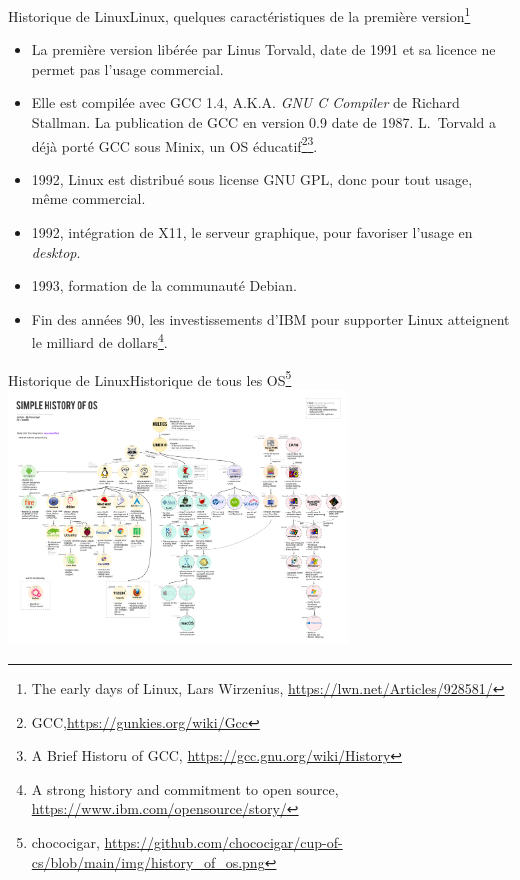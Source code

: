 \documentclass{beamer}
\begin{document}
    \begin{frame}{Historique de Linux}{Linux, quelques caractéristiques de la première version\footnote{The early days of Linux, Lars Wirzenius, \url{https://lwn.net/Articles/928581/}}}
        \begin{footnotesize}
            \begin{itemize}
                \item La première version libérée par Linus Torvald, date de 1991 et sa licence ne permet pas l'usage commercial.
                \item Elle est compilée avec GCC 1.4, A.K.A. \textit{GNU C Compiler} de Richard Stallman.
                La publication de GCC en version 0.9 date de 1987.
                L.~Torvald a déjà porté GCC sous Minix, un OS éducatif\footnote{GCC,\url{https://gunkies.org/wiki/Gcc}}\footnotestep\footnote{A Brief Historu of GCC, \url{https://gcc.gnu.org/wiki/History}}.
                \item 1992, Linux est distribué sous license GNU GPL, donc pour tout usage, même commercial.
                \item 1992, intégration de X11, le serveur graphique, pour favoriser l'usage en \textit{desktop}.
                \item 1993, formation de la communauté Debian.
                \item Fin des années 90, les investissements d'IBM pour supporter Linux atteignent le milliard de dollars\footnote{A strong history and commitment to open source, \url{https://www.ibm.com/opensource/story/}}.
            \end{itemize}
        \end{footnotesize}
    \end{frame}

    \begin{frame}{Historique de Linux}{Historique de tous les OS\footnote{chococigar, \url{https://github.com/chococigar/cup-of-cs/blob/main/img/history\_of\_os.png}}}
        \centering
        \includegraphics[width=9cm]{image/history_of_os}
    \end{frame}
\end{document}
